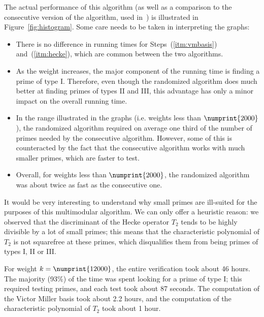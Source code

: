 \documentclass[11pt]{article}
\theoremstyle{plain}
\theoremstyle{definition}
\theoremstyle{remark}
\numberwithin{equation}{section}
\begin{document}
The actual performance of this algorithm (as well as a comparison to the
consecutive version of the algorithm, used in~\cite{ConreyFarmer}) is
illustrated in Figure~\ref{fig:histogram}.  Some care needs to be taken in
interpreting the graphs:
\begin{itemize}
  \item There is no difference in running times for Steps~(\ref{itm:vmbasis}) 
    and~(\ref{itm:hecke}), which 
    are common between the two algorithms.
  \item As the weight increases, the major component of the running time is
    finding a prime of type I.  Therefore, even though the randomized
    algorithm does much better at finding primes of types II and III, this
    advantage has only a minor impact on the overall running time.
  \item In the range illustrated in the graphs (i.e. weights less than
    $\numprint{2000}$), the randomized algorithm required on average one third
    of the number of primes needed by the consecutive algorithm.  However,
    some of this is counteracted by the fact that the consecutive algorithm
    works with much smaller primes, which are faster to test.
  \item Overall, for weights less than $\numprint{2000}$, the randomized 
    algorithm was about twice as fast as the consecutive one.  
\end{itemize}

It would be very interesting to understand why small primes are ill-suited for
the purposes of this multimodular algorithm.  We can only offer a heuristic
reason: we observed that the discriminant of the Hecke operator $T_2$ tends to
be highly divisible by a lot of small primes; this means that the
characteristic polynomial of $T_2$ is not squarefree at these primes, which
disqualifies them from being primes of types I, II or III.

For weight $k=\numprint{12000}$, the entire verification took about 46 hours.
The majority (93\%) of the time was spent looking for a prime of type I; this
required testing  primes, and each test took about 87 seconds.
The computation of the Victor Miller basis took about 2.2 hours, and the
computation of the characteristic polynomial of $T_2$ took about 1 hour.
\end{document}
